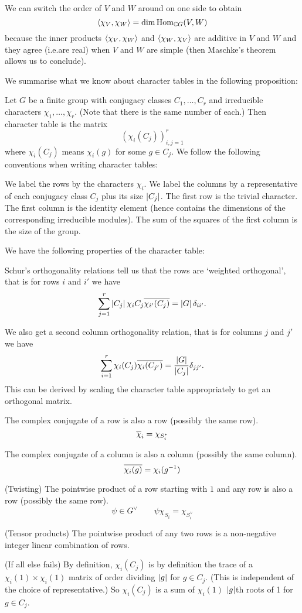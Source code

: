 \begin{rmk}
  We can switch the order of $V$ and $W$ around on one side to obtain
  \[{\left\langle \chi_V,\chi_W \right\rangle} = \dim \operatorname{Hom}_{\mathbb{C} G}(V,W)\]
  because the inner products ${\left\langle \chi_V,\chi_W \right\rangle}$ and ${\left\langle \chi_W,\chi_V \right\rangle}$ are additive in $V$ and $W$ and they agree (i.e.\@ are real) when $V$ and $W$ are simple (then Maschke's theorem allows us to conclude).
\end{rmk}

We summarise what we know about character tables in the following proposition:
\begin{prop}
  Let $G$ be a finite group with conjugacy classes $C_1,\ldots,C_r$ and irreducible characters $\chi_1,\ldots,\chi_r$.
  (Note that there is the same number of each.)
  Then character table is the matrix
  \[\left(\chi_i(C_j)\right)_{i,j=1}^r\]
  where $\chi_i(C_j)$ means $\chi_i(g)$ for some $g \in C_j$.
  We follow the following conventions when writing character tables:
  \begin{enum}
    \io We label the rows by the characters $\chi_i$.
    \io We label the columns by a representative of each conjugacy class $C_j$ plus its size $\left\lvert C_j \right\rvert$.
    \io The first row is the trivial character.
    \io The first column is the identity element (hence contains the dimensions of the corresponding irreducible modules).
    The sum of the squares of the first column is the size of the group.
  \end{enum}
  We have the following properties of the character table:
  \begin{enum}
    \io
    Schur's orthogonality relations tell us that the rows are `weighted orthogonal', that is for rows $i$ and $i'$ we have
    \[\sum_{j=1}^r \left\lvert C_j \right\rvert \chi_i{C_j} \overline{\chi_{i'}(C_j)} = \left\lvert G \right\rvert \delta_{ii'}.\]

    \io
    We also get a second column orthogonality relation, that is for columns $j$ and $j'$ we have
    \[\sum_{i=1}^r \chi_i(C_j) \overline{\chi_i(C_{j'})} = \frac{\left\lvert G \right\rvert}{\left\lvert C_j \right\rvert}\delta_{jj'}.\]
    This can be derived by scaling the character table appropriately to get an orthogonal matrix.

    \io
    The complex conjugate of a row is also a row (possibly the same row).
    \[\overline\chi_i = \chi_{S_i^*}\]

    \io
    The complex conjugate of a column is also a column (possibly the same column).
    \[\overline{\chi_i(g)} = \chi_i(g^{-1})\]

    \io
    (Twisting) The pointwise product of a row starting with $1$ and any row is also a row (possibly the same row).
    \[\psi \in G^\vee \qquad \psi\chi_{S_i}=\chi_{S_i^\vee}\]

    \io
    (Tensor products) The pointwise product of any two rows is a non-negative integer linear combination of rows.

    \io
    (If all else fails) By definition, $\chi_i(C_j)$ is by definition the trace of a $\chi_i(1) \times \chi_i(1)$ matrix of order dividing $\left\lvert g \right\rvert$ for $g \in C_j$.
    (This is independent of the choice of representative.)
    So $\chi_i(C_j)$ is a sum of $\chi_i(1)$ $\left\lvert g \right\rvert$th roots of 1 for $g \in C_j$.
  \end{enum}
\end{prop}

